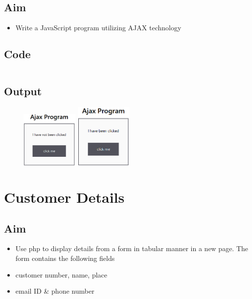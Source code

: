 \documentclass{article}
\begin{document}
\subsection{Aim}
\begin{itemize}
  \item Write a JavaScript program utilizing AJAX technology
\end{itemize}

\subsection{Code}
\inputminted[frame=lines, breaklines, breakanywhere, numberblanklines=false]{html}{./prog_20/index.html}

\subsection{Output}
\begin{figure}[h!]
	\centering
	\includegraphics[width=0.25\textwidth]{./Assets/p2001.png}
	\includegraphics[width=0.25\textwidth]{./Assets/p2002.png}
\end{figure}
\newpage

\section{Customer Details}
\subsection{Aim}
\begin{itemize}
  \item Use php to display details from a form in tabular manner in a new page. The form contains the following fields
  \item customer number, name, place
  \item email ID \& phone number
\end{itemize}
\end{document}
